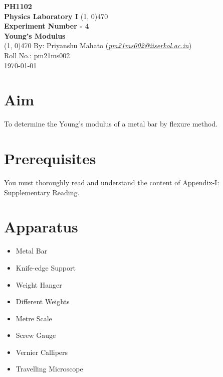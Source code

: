 \documentclass[12pt]{article}
\begin{document}
	\thispagestyle{empty}
	\begin{titlepage}
		\begin{center}
			\vspace{2cm}
			\huge\textbf{PH1102}\\
			\vspace{1cm}
			\large\textbf{Physics Laboratory I}
			\vfill
			\line(1, 0){470}\\[14pt]
			\huge\textbf{\color{ChadBlue}\sffamily Experiment Number - 4}\\[10pt]
			\Large\textbf{\color{mauve}\sffamily Young's Modulus}\\[14pt]
			\line(1, 0){470}
			\vfill
			By: Priyanshu Mahato (\href{mailto:pm21ms002@iiserkol.ac.in}{\emph{\color{dkgreen}pm21ms002@iiserkol.ac.in}})\\
			Roll No.: pm21ms002\\
			\today
		\end{center}
	\end{titlepage}

	\thispagestyle{empty}
	\tableofcontents
	\thispagestyle{empty}
	\clearpage
	
	\setcounter{page}{1}


	\section{Aim}
	
	To determine the Young’s modulus of a metal bar by flexure method.
	
	\section{Prerequisites}
	
	You must thoroughly read and understand the content of Appendix-I: Supplementary Reading.
	
	\section{Apparatus}
	
	\begin{itemize}
		\item Metal Bar
		\item Knife-edge Support
		\item Weight Hanger
		\item Different Weights
		\item Metre Scale
		\item Screw Gauge
		\item Vernier Callipers
		\item Travelling Microscope
	\end{itemize} 
\end{document}
